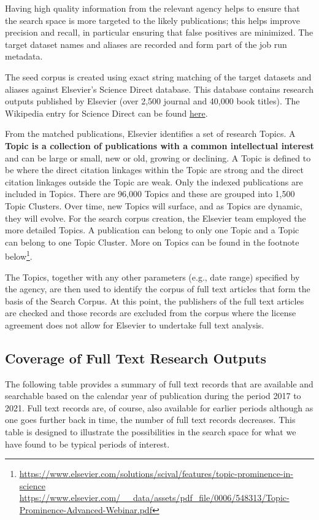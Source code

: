 \documentclass[titlepage, 11pt]{article}
\begin{document}
{Having high quality information from the relevant agency helps to ensure that the search space is more targeted to the likely publications; this helps improve precision and recall, in particular ensuring that false positives are minimized.  The target dataset names and aliases are recorded and form part of the job run metadata.

The seed corpus is created using exact string matching of the target datasets and aliases against Elsevier’s Science Direct database. This database contains research outputs published by Elsevier (over 2,500 journal and 40,000 book titles). The Wikipedia entry for Science Direct can be found \href{https://en.wikipedia.org/wiki/ScienceDirect}{here}. 

From the matched publications, Elsevier identifies a set of research Topics.  A \textbf{Topic is a collection of publications with a common intellectual interest} and can be large or small, new or old, growing or declining. A Topic is defined to be where the direct citation linkages within the Topic are strong and the direct citation linkages outside the Topic are weak. Only the indexed publications are included in Topics. There are 96,000 Topics and these are grouped into 1,500 Topic Clusters. Over time, new Topics will surface, and as Topics are dynamic, they will evolve. For the search corpus creation, the Elsevier team employed the more detailed Topics. A publication can belong to only one Topic and a Topic can belong to one Topic Cluster. More on Topics can be found in the footnote below\footnote{\url{https://www.elsevier.com/solutions/scival/features/topic-prominence-in-science}\\\url{https://www.elsevier.com/__data/assets/pdf_file/0006/548313/Topic-Prominence-Advanced-Webinar.pdf}}. 

The Topics, together with any other parameters (e.g., date range) specified by the agency, are then used to identify the corpus of full text articles that form the basis of the Search Corpus. At this point, the publishers of the full text articles are checked and those records are excluded from the corpus where the license agreement does not allow for Elsevier to undertake full text analysis.

\subsection{Coverage of Full Text Research Outputs}
The following table provides a summary of full text records that are available and searchable based on the calendar year of publication during the period 2017 to 2021. Full text records are, of course, also available for earlier periods although as one goes further back in time, the number of full text records decreases. This table is designed to illustrate the possibilities in the search space for what we have found to be typical periods of interest. 

}
\end{document}
